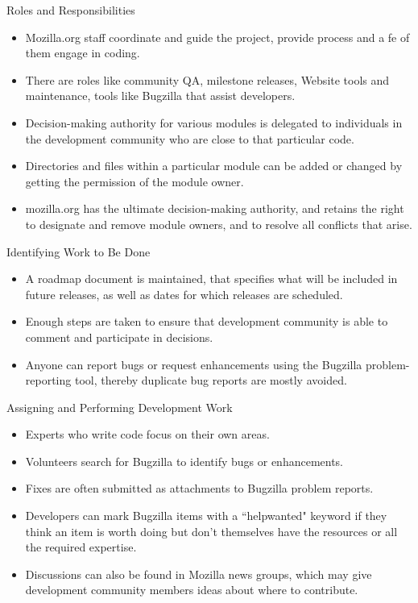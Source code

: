 \documentclass{beamer}
\begin{document}
\begin{frame}{Roles and Responsibilities}
\begin{itemize}
	\item Mozilla.org staff coordinate and guide the project, provide process and a fe of them engage in coding. \pause
	\item There are roles like community QA, milestone releases, Website tools and maintenance, tools like Bugzilla that assist developers. \pause
	\item Decision-making authority for various modules is delegated to individuals in the development community who are close to that particular code. \pause
	\item Directories and files within a particular module can be added or changed by getting the permission of the module owner.\pause
	\item mozilla.org has the ultimate decision-making authority, and retains the right to designate and remove module owners, and to resolve all conflicts that arise.
\end{itemize}
\end{frame}

\begin{frame}{Identifying Work to Be Done}
\begin{itemize}
	\item A roadmap document is maintained, that specifies what will be included in future releases, as well as dates for which releases are scheduled.\pause
	\item Enough steps are taken to ensure that development community is able to comment and participate in decisions. \pause
	\item Anyone can report bugs or request enhancements using the Bugzilla problem-reporting tool, thereby duplicate bug reports are mostly avoided.
\end{itemize}
\end{frame}

\begin{frame}{Assigning and Performing Development Work}
\begin{itemize}
	\item Experts who write code focus on their own areas. \pause
	\item Volunteers search for Bugzilla to identify bugs or enhancements. \pause
	\item Fixes are often submitted as attachments to Bugzilla problem reports.\pause
	\item Developers can mark Bugzilla items with a ``helpwanted" keyword if they think an item is worth doing but don’t themselves have the resources or all the required expertise.\pause
	\item Discussions can also be found in Mozilla news groups, which may give development community members ideas about where to contribute.
\end{itemize}
\end{frame}
\end{document}
